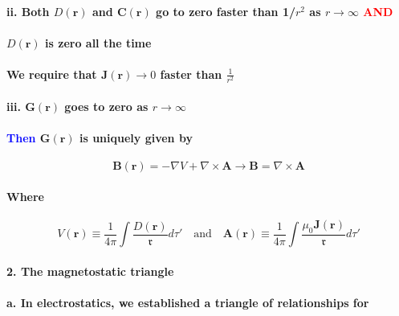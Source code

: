 \documentclass{article}
\begin{document}
\paragraph{\indent\indent ii. Both $D(\boldsymbol{r})$ and $\boldsymbol{C}(\boldsymbol{r})$ go to zero faster than 1/$r^2$ as $r\rightarrow \infty$ \textcolor{red}{AND}}
\paragraph{\indent \indent \checkmark \quad $D(\boldsymbol{r})$ is zero all the time}
\paragraph{\indent\indent \checkmark \quad We require that $\boldsymbol{J}(\boldsymbol{r})\rightarrow 0 $ faster than $\frac{1}{r^2}$}
\paragraph{\indent\indent iii. $\boldsymbol{G}(\boldsymbol{r})$ goes to zero as $r\rightarrow\infty$}
\paragraph{\indent \textcolor{blue}{Then} $\boldsymbol{G}(\boldsymbol{r})$ is uniquely given by}
\begin{equation*}
    \boldsymbol{B}(\boldsymbol{r})=-\nabla V+\nabla\times \boldsymbol{A}\rightarrow \boldsymbol{B}=\nabla\times\boldsymbol{A}
\end{equation*}
\paragraph{Where}
\begin{equation*}
    V(\boldsymbol{r})\equiv\frac{1}{4\pi}\int\frac{D(\boldsymbol{r})}{\mathfrak{r}}d\tau'\quad\text{and}\quad \boldsymbol{A}(\boldsymbol{r})\equiv\frac{1}{4\pi}\int\frac{\mu_0\boldsymbol{J}(\boldsymbol{r})}{\mathfrak{r}}d\tau'
\end{equation*}
\paragraph{2. The magnetostatic triangle}
\paragraph{\indent a. In electrostatics, we established a triangle of relationships for}
\end{document}
